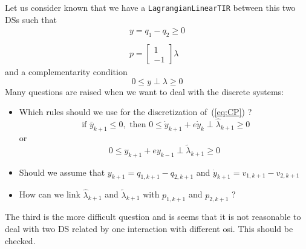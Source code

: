 Let us consider known that we have a {\tt LagrangianLinearTIR} between this two DSs such that
\begin{equation}
  \label{eq:LTIR-2DS}
  \begin{array}{l}
  y = q_1-q_2 \geq 0 \\ \\
  p = \left[
  \begin{array}{c}
    1 \\
    -1
  \end{array}\right] \lambda
\end{array}
\end{equation}
and a complementarity condition
\begin{equation}
  \label{eq:CP}
  0\leq y \perp \lambda \geq 0
\end{equation}
Many questions are raised when we want to deal with the discrete systems:
\begin{itemize}
\item Which rules should we use for the discretization of~(\ref{eq:CP}) ?
  \begin{equation}
    \label{eq:CP-TS1}
    \text{ if } \bar y_{k+1}\leq 0, \text{ then }  0\leq \dot y _{k+1} + e \dot y_{k} \perp \hat \lambda_{k+1}\geq 0 
  \end{equation}
  or
  \begin{equation}
    \label{eq:CP-TS2}
    0\leq y _{k+1} + e y_{k-1} \perp \tilde \lambda_{k+1}\geq 0 
  \end{equation}
\item Should we assume that $y_{k+1} = q_{1,k+1}-q_{2,k+1}$ and $\dot y_{k+1} = v_{1,k+1}-v_{2,k+1}$
\item How can we link $\hat \lambda_{k+1}$ and  $\tilde \lambda_{k+1}$ with $p_{1,k+1}$ and $p_{2,k+1}$ ?
\end{itemize}

The third is the more difficult question and is seems that it is not reasonable to deal with two DS related by one interaction with different osi. This should be checked.




